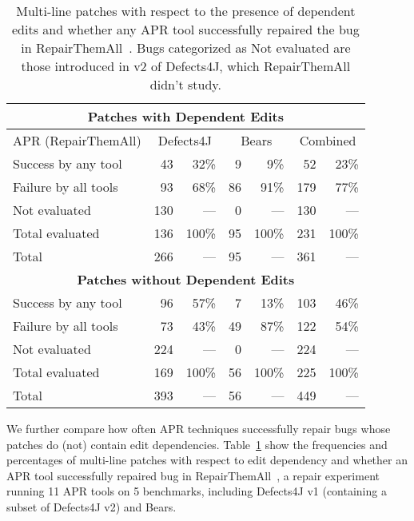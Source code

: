 \documentclass[sigconf, timestamp-false, anonymous=true]{acmart}
\begin{document}
\begin{table}
{\begin{center}
	\begin{tabular}{l  rr  rr  rr}
		\toprule
		\multicolumn{7}{c}{\textbf{Patches with Dependent Edits}} \\
		\midrule
		APR (RepairThemAll) & \multicolumn{2}{c}{Defects4J} & \multicolumn{2}{c}{Bears} & \multicolumn{2}{c}{Combined} \\
		\midrule
		Success by any tool & 43 & 32\% & 9 & 9\% & 52 & 23\% \\
		Failure by all tools & 93 & 68\% & 86 & 91\% & 179 & 77\% \\
		Not evaluated & 130 & --- & 0 & --- & 130 & --- \\
		\midrule
		Total evaluated & 136 & 100\% & 95 & 100\% & 231 & 100\% \\
		Total & 266 & --- & 95 & --- & 361 & --- \\
		\midrule
		\multicolumn{7}{c}{\textbf{Patches without Dependent Edits}} \\
		\midrule
		Success by any tool & 96 & 57\% & 7 & 13\% & 103 & 46\% \\
		Failure by all tools & 73 & 43\% & 49 & 87\% & 122 & 54\% \\
		Not evaluated & 224 & --- & 0 & --- & 224 & --- \\
		\midrule
		Total evaluated & 169 & 100\% & 56 & 100\% & 225 & 100\% \\
		Total & 393 & --- & 56 & --- & 449 & --- \\
		\bottomrule
	\end{tabular}
 \end{center}
}
	\caption{Multi-line patches with respect to the presence of 
	dependent edits and whether any APR tool successfully 
	repaired the bug in RepairThemAll~\cite{durieux-repair-them-all}.
	Bugs categorized as {\normalfont Not evaluated} are those introduced in 
	v2 of Defects4J, which RepairThemAll didn't study.}
	\label{tab:dependency-repair-contingency-table}
\end{table}

We further compare how often APR techniques 
successfully repair bugs whose patches do (not) contain edit dependencies.
Table~\ref{tab:dependency-repair-contingency-table}
show the frequencies and percentages of multi-line patches with respect to edit dependency 
and whether an APR tool successfully repaired bug in 
RepairThemAll~\cite{durieux-repair-them-all}, a repair experiment running 
11 APR tools on 5 benchmarks, including Defects4J v1 (containing a subset of Defects4J v2) and Bears.
\end{document}
